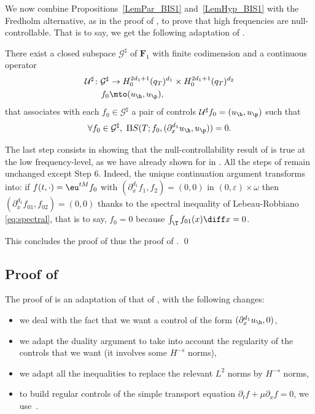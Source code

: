We now combine Propositions~\ref{LemPar_BIS1} and~\ref{LemHyp_BIS1} with the Fredholm alternative, as in the proof of , to prove that high frequencies are null-controllable. That is to say, we get the following adaptation of .
\begin{prop}
\label{PropControlHighFreqd_xPar}
There exist a closed subspace $\mathcal{G}^{\sharp}$ of $\mathbf{F}_1$ with finite codimension and a continuous operator
\begin{align*}
\mathcal U^{\sharp} \colon
\mathcal{G}^{\sharp} &\to H_0^{2d_1+1}(q_T)^{d_1} \times H_0^{2d_1+1}(q_T)^{d_2}\\
f_0 &\mto (u_{\h},u_{\p}),
\end{align*}
that associates with each $f_0 \in \mathcal{G}^{\sharp}$ a pair of controls $\mathcal U^{\sharp} f_{0}=(u_{\h}, u_{\p})$ such that
\begin{equation}
\label{PropKd_xPar}
\forall f_0 \in \mathcal{G}^{\sharp},\ \Pi S(T;f_0, (\partial_{x}^{d_1}u_{\h}, u_{\p})) = 0.
\end{equation}
\end{prop}

The last step consists in showing that the null-controllability result of  is true at the low frequency-level, as we have already shown for  in . All the steps of  remain unchanged except Step 6. Indeed, the unique continuation argument transforms into: if $f(t,\cdot) = \eu^{tM} f_0$ with $(\partial_x^{d_1} f_1, f_2) = (0,0)$ in $(0,\varepsilon)\times\omega$ then $(\partial_x^{d_1} f_{01},f_{02})= (0,0)$ thanks to the spectral inequality of Lebeau-Robbiano \eqref{eq:spectral}, that is to say, $f_0 = 0$ because $\int_{\T} f_{01}(x) \diff x =0$.

This concludes the proof of  thus the proof of . \qed

\subsection{Proof of }
The proof of  is an adaptation of that of , with the following changes:
\begin{itemize}
\item we deal with the fact that we want a control of the form $(\partial_x^{d_1}u_\h,0)$,
\item we adapt the duality argument to take into account the regularity of the controls that we want (it involves some $H^{-s}$ norms),
\item we adapt all the inequalities to replace the relevant $L^2$ norms by $H^{-s}$ norms,
\item to build regular controls of the simple transport equation $\partial_t f+ \mu\partial_x f=0$, we use~\cite{alabau-boussouira_2017}.
\end{itemize}

